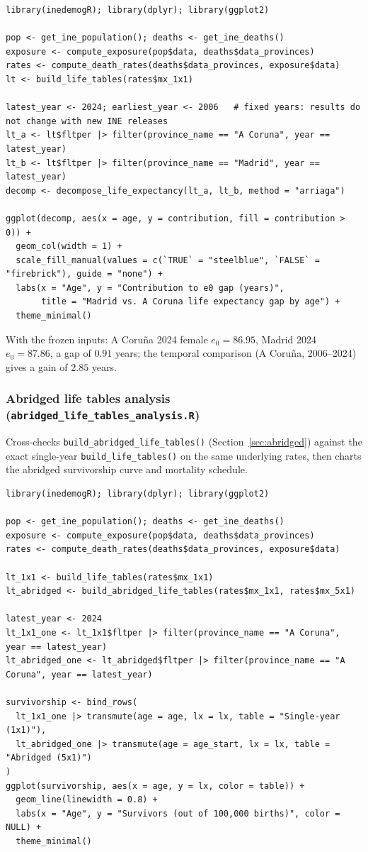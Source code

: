 \documentclass[11pt]{article}
\newcommand{\fn}[1]{\texttt{#1}}
\begin{document}
\begin{lstlisting}
library(inedemogR); library(dplyr); library(ggplot2)

pop <- get_ine_population(); deaths <- get_ine_deaths()
exposure <- compute_exposure(pop$data, deaths$data_provinces)
rates <- compute_death_rates(deaths$data_provinces, exposure$data)
lt <- build_life_tables(rates$mx_1x1)

latest_year <- 2024; earliest_year <- 2006   # fixed years: results do not change with new INE releases
lt_a <- lt$fltper |> filter(province_name == "A Coruna", year == latest_year)
lt_b <- lt$fltper |> filter(province_name == "Madrid", year == latest_year)
decomp <- decompose_life_expectancy(lt_a, lt_b, method = "arriaga")

ggplot(decomp, aes(x = age, y = contribution, fill = contribution > 0)) +
  geom_col(width = 1) +
  scale_fill_manual(values = c(`TRUE` = "steelblue", `FALSE` = "firebrick"), guide = "none") +
  labs(x = "Age", y = "Contribution to e0 gap (years)",
       title = "Madrid vs. A Coruna life expectancy gap by age") +
  theme_minimal()
\end{lstlisting}

With the frozen inputs: A Coru\~{n}a 2024 female $e_0 = 86.95$, Madrid 2024
$e_0 = 87.86$, a gap of $0.91$ years; the temporal comparison (A Coru\~{n}a,
2006--2024) gives a gain of $2.85$ years.

\subsubsection{Abridged life tables analysis (\fn{abridged\_life\_tables\_analysis.R})}

Cross-checks \fn{build\_abridged\_life\_tables()} (Section~\ref{sec:abridged})
against the exact single-year \fn{build\_life\_tables()} on the same
underlying rates, then charts the abridged survivorship curve and mortality
schedule.

\begin{lstlisting}
library(inedemogR); library(dplyr); library(ggplot2)

pop <- get_ine_population(); deaths <- get_ine_deaths()
exposure <- compute_exposure(pop$data, deaths$data_provinces)
rates <- compute_death_rates(deaths$data_provinces, exposure$data)

lt_1x1 <- build_life_tables(rates$mx_1x1)
lt_abridged <- build_abridged_life_tables(rates$mx_1x1, rates$mx_5x1)

latest_year <- 2024
lt_1x1_one <- lt_1x1$fltper |> filter(province_name == "A Coruna", year == latest_year)
lt_abridged_one <- lt_abridged$fltper |> filter(province_name == "A Coruna", year == latest_year)

survivorship <- bind_rows(
  lt_1x1_one |> transmute(age = age, lx = lx, table = "Single-year (1x1)"),
  lt_abridged_one |> transmute(age = age_start, lx = lx, table = "Abridged (5x1)")
)
ggplot(survivorship, aes(x = age, y = lx, color = table)) +
  geom_line(linewidth = 0.8) +
  labs(x = "Age", y = "Survivors (out of 100,000 births)", color = NULL) +
  theme_minimal()
\end{lstlisting}
\end{document}
